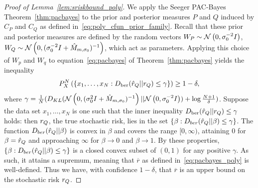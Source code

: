 \documentclass[onefignum,onetabnum]{siamart171218}
\begin{document}
\begin{proof}[Proof of Lemma~\ref{lem:sriskbound_poly}]
    We apply the Seeger PAC-Bayes Theorem~\ref{thm:pacbayes} to the prior and posterior
    measures $P$ and $Q$ induced by $C_{P}$ and $C_{Q}$ as
    defined in~\eqref{eq:poly_cfun_prior_family}.
    Recall that these prior and posterior measures are defined by the random
    vectors
    $W_P\sim\mathcal{N}\left(0, \sigma_0^{-2}I\right)$,
    $W_Q\sim\mathcal{N}\left(0, (\sigma_0^{-2}I + \hat{M}_{m,\sigma_0})^{-1}\right)$,
    which act as parameters.
    Applying this choice of $W_p$ and $W_q$ to equation~\eqref{eq:pacbayes}
    of Theorem~\ref{thm:pacbayes} yields the inequality
   \begin{equation}
   P_X^N\left(\left\{ x_1,\dotsc,x_N : 
   D_{\text{ber}}(\hat{r}_{Q} || r_{Q})
   \le \gamma\right\}\right) \ge 1-\delta, 
   \end{equation}
   where 
   $\gamma=\tfrac{1}{N}(D_{KL}(\mathcal{N}\left(0,(\sigma_0^{2}I + \hat{M}_{m,\sigma_0})^{-1}\right) || \mathcal{N}\left(0,\sigma_0^{-2}I\right)) + \log\frac{N+1}{\delta})$.
    Suppose the data set $x_1,\dotsc,x_N$ is one such that the inner inequality
    $ D_{\text{ber}}(\hat{r}_{Q} || r_{Q}) \le\gamma $ 
    holds: then $r_{Q}$, the true stochastic risk, lies in the set
    $\{\beta : D_{ber}(\hat{r}_{Q}||\beta) \le\gamma\}$.
    The function $D_{ber}(\hat{r}_{Q} || \beta)$ is convex in $\beta$ and covers
    the range $[0,\infty)$, attaining $0$ for $\beta=\hat{r}_{Q}$ and approaching
    $\infty$ for $\beta\to 0$ and $\beta\to 1$.
    By these properties,
    $\{\beta : D_{ber}(\hat{r}_{Q}||\beta) \le\gamma\}$
    is a closed convex subset of $(0,1)$ for any positive $\gamma$.
    As such, it attains a supremum,
    meaning that $\overline{r}$ as defined in~\eqref{eq:pacbayes_poly} is
    well-defined. Thus we have, with confidence $1-\delta$, that $\overline{r}$
    is an upper bound on the stochastic risk $r_{Q}$.
\end{proof}
\end{document}
